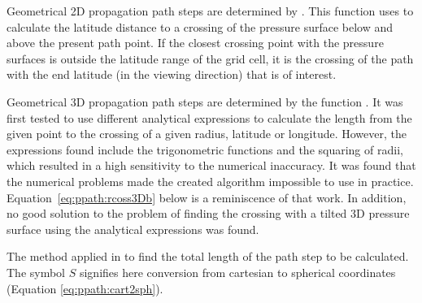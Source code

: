 Geometrical 2D propagation path steps are determined by
. This function uses
 to calculate the latitude distance
to a crossing of the pressure surface below and above the present path
point. If the closest crossing point with the pressure surfaces is
outside the latitude range of the grid cell, it is the crossing of the
path with the end latitude (in the viewing direction) that is of
interest.


\label{sec:ppath:3Dgeom}

Geometrical 3D propagation path steps are determined by the function
. It was first tested to use different
analytical expressions to calculate the length from the given point to
the crossing of a given radius, latitude or longitude. However, the
expressions found include the trigonometric functions and the squaring
of radii, which resulted in a high sensitivity to the numerical
inaccuracy. It was found that the numerical problems made the created
algorithm impossible to use in practice.
Equation~\ref{eq:ppath:rcoss3Db} below is a reminiscence of that work.
In addition, no good solution to the problem of finding the crossing
with a tilted 3D pressure surface using the analytical expressions was
found.

\begin{algorithm}[!t]
 \begin{algorithmic}
  \ELSE
  \ENDIF
   \ELSE
   \ENDIF
  \ENDWHILE
   \ELSE
   \ENDIF
   \ELSE
   \ENDIF
  \ENDWHILE
 \end{algorithmic}
 \caption{The method applied in  to find the 
          total length of the path step to be calculated.
          The symbol $S$ signifies here conversion from cartesian to
          spherical coordinates (Equation \ref{eq:ppath:cart2sph}).}
 \label{alg:ppath:dogridcell3d}
\end{algorithm}

